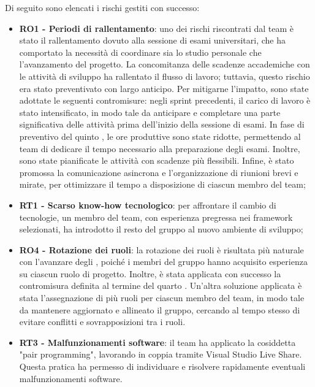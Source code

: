 \vspace{0.5\baselineskip}
\par Di seguito sono elencati i rischi gestiti con successo:
\begin{itemize}
  \item \textbf{RO1 - Periodi di rallentamento}: uno dei rischi riscontrati dal team è stato il rallentamento dovuto alla sessione di esami universitari, che ha comportato la necessità di coordinare sia lo studio personale che l'avanzamento del progetto. La concomitanza delle scadenze accademiche con le attività di sviluppo ha rallentato il flusso di lavoro; tuttavia, questo rischio era stato preventivato con largo anticipo. Per mitigarne l'impatto, sono state adottate le seguenti contromisure: negli sprint precedenti, il carico di lavoro è stato intensificato, in modo tale da anticipare e completare una parte significativa delle attività prima dell'inizio della sessione di esami. In fase di preventivo del quinto , le ore produttive sono state ridotte, permettendo al team di dedicare il tempo necessario alla preparazione degli esami. Inoltre, sono state pianificate le attività con scadenze più flessibili. Infine, è stato promossa la comunicazione asincrona e l'organizzazione di riunioni brevi e mirate, per ottimizzare il tempo a disposizione di ciascun membro del team;
  \item \textbf{RT1 - Scarso know-how tecnologico}: per affrontare il cambio di tecnologie, un membro del team, con esperienza pregressa nei framework selezionati, ha introdotto il resto del gruppo al nuovo ambiente di sviluppo;
  \item \textbf{RO4 - Rotazione dei ruoli}: la rotazione dei ruoli è risultata più naturale con l'avanzare degli , poiché i membri del gruppo hanno acquisito esperienza su ciascun ruolo di progetto. Inoltre, è stata applicata con successo la contromisura definita al termine del quarto . Un'altra soluzione applicata è stata l'assegnazione di più ruoli per ciascun membro del team, in modo tale da mantenere aggiornato e allineato il gruppo, cercando al tempo stesso di evitare conflitti e sovrapposizioni tra i ruoli.
  \item \textbf{RT3 - Malfunzionamenti software}: il team ha applicato la cosiddetta "pair programming", lavorando in coppia tramite Visual Studio Live Share. Questa pratica ha permesso di individuare e risolvere rapidamente eventuali malfunzionamenti software.
\end{itemize}
